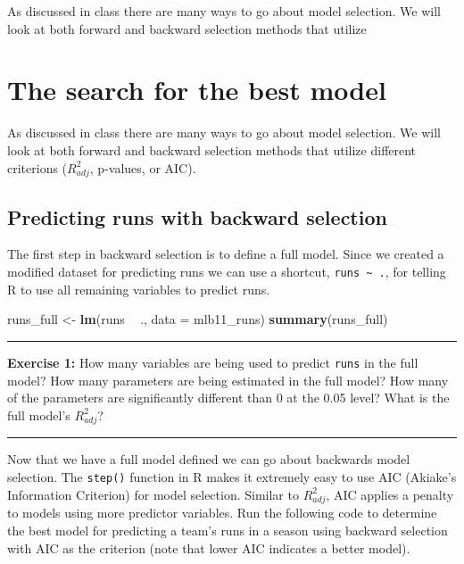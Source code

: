 \documentclass[]{book}
\newenvironment{Shaded}{\begin{snugshade}}{\end{snugshade}}
\newcommand{\KeywordTok}[1]{\textcolor[rgb]{0.13,0.29,0.53}{\textbf{#1}}}
\newcommand{\DataTypeTok}[1]{\textcolor[rgb]{0.13,0.29,0.53}{#1}}
\newcommand{\StringTok}[1]{\textcolor[rgb]{0.31,0.60,0.02}{#1}}
\newcommand{\OperatorTok}[1]{\textcolor[rgb]{0.81,0.36,0.00}{\textbf{#1}}}
\newcommand{\NormalTok}[1]{#1}
\theoremstyle{definition}
\theoremstyle{definition}
\theoremstyle{definition}
\theoremstyle{remark}
\begin{document}
As discussed in class there are many ways to go about model selection.
We will look at both forward and backward selection methods that utilize

\section{The search for the best
model}\label{the-search-for-the-best-model}

As discussed in class there are many ways to go about model selection.
We will look at both forward and backward selection methods that utilize
different criterions (\(R^2_{adj}\), p-values, or AIC).

\subsection{Predicting runs with backward
selection}\label{predicting-runs-with-backward-selection}

The first step in backward selection is to define a full model. Since we
created a modified dataset for predicting runs we can use a shortcut,
\texttt{runs\ \textasciitilde{}\ .}, for telling R to use all remaining
variables to predict runs.

\begin{Shaded}
\begin{Highlighting}[]
\NormalTok{runs_full <-}\StringTok{ }\KeywordTok{lm}\NormalTok{(runs }\OperatorTok{~}\StringTok{ }\NormalTok{., }\DataTypeTok{data =}\NormalTok{ mlb11_runs)}
\KeywordTok{summary}\NormalTok{(runs_full)}
\end{Highlighting}
\end{Shaded}

\begin{center}\rule{0.5\linewidth}{\linethickness}\end{center}

\textbf{Exercise 1:} How many variables are being used to predict
\texttt{runs} in the full model? How many parameters are being estimated
in the full model? How many of the parameters are significantly
different than 0 at the 0.05 level? What is the full model's
\(R^2_{adj}\)?

\begin{center}\rule{0.5\linewidth}{\linethickness}\end{center}

Now that we have a full model defined we can go about backwards model
selection. The \texttt{step()} function in R makes it extremely easy to
use AIC (Akiake's Information Criterion) for model selection. Similar to
\(R^2_{adj}\), AIC applies a penalty to models using more predictor
variables. Run the following code to determine the best model for
predicting a team's runs in a season using backward selection with AIC
as the criterion (note that lower AIC indicates a better model).
\end{document}
